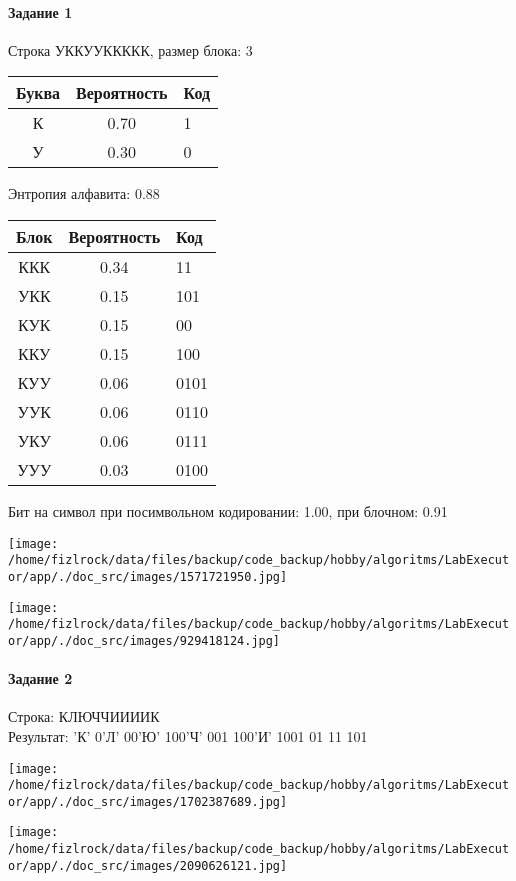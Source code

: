\documentclass[a4paper, 12pt]{article}
\begin{document}
\paragraph{Задание 1}

Строка УККУУККККК, размер блока: 3
\begin{center}
 \begin{tabular}{ |c|c|l| } 
  \hline
     Буква & Вероятность & Код\\ \hline
К & 0.70 & 1\\\hline
У & 0.30 & 0
\\ \hline \end{tabular}
\end{center}
Энтропия алфавита: 0.88
\begin{center}
 \begin{tabular}{ |c|c|l| } 
  \hline
     Блок & Вероятность & Код\\ \hline
ККК & 0.34 & 11\\\hline
УКК & 0.15 & 101\\\hline
КУК & 0.15 & 00\\\hline
ККУ & 0.15 & 100\\\hline
КУУ & 0.06 & 0101\\\hline
УУК & 0.06 & 0110\\\hline
УКУ & 0.06 & 0111\\\hline
УУУ & 0.03 & 0100
\\ \hline \end{tabular}
\end{center}
Бит на символ при посимвольном кодировании: 1.00, при блочном: 0.91

\texttt{[image: /home/fizlrock/data/files/backup/code\_backup/hobby/algoritms/LabExecutor/app/./doc\_src/images/1571721950.jpg]}

\texttt{[image: /home/fizlrock/data/files/backup/code\_backup/hobby/algoritms/LabExecutor/app/./doc\_src/images/929418124.jpg]}
\pagebreak
\paragraph{Задание 2}

Строка: 
КЛЮЧЧИИИИК\\
Результат: 'К' 0'Л' 00'Ю' 100'Ч' 001 100'И' 1001 01 11 101

\texttt{[image: /home/fizlrock/data/files/backup/code\_backup/hobby/algoritms/LabExecutor/app/./doc\_src/images/1702387689.jpg]}

\texttt{[image: /home/fizlrock/data/files/backup/code\_backup/hobby/algoritms/LabExecutor/app/./doc\_src/images/2090626121.jpg]}
\end{document}
